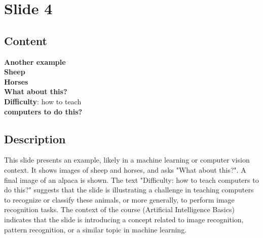 \documentclass{article}%
\begin{document}
%
\newpage%
\section{Slide 4}%
\label{sec:Slide4}%
\subsection{Content}%

\textbf{Another example} \\
\textbf{Sheep} \\
\textbf{Horses} \\
\textbf{What about this?} \\
\textbf{Difficulty}: how to teach \\
\textbf{computers to do this?}
%
\subsection{Description}%
This slide presents an example, likely in a machine learning or computer vision context.  It shows images of sheep and horses, and asks "What about this?".  A final image of an alpaca is shown.  The text "Difficulty: how to teach computers to do this?" suggests that the slide is illustrating a challenge in teaching computers to recognize or classify these animals, or more generally, to perform image recognition tasks.  The context of the course (Artificial Intelligence Basics) indicates that the slide is introducing a concept related to image recognition, pattern recognition, or a similar topic in machine learning.%
\end{document}
